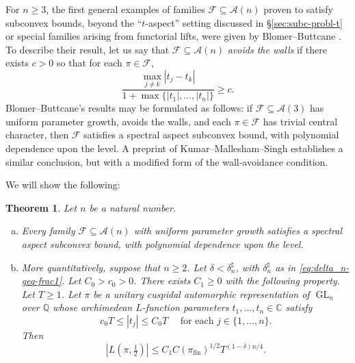 \documentclass[reqno]{amsart}
\DeclareMathOperator{\GL}{GL}
\DeclareMathOperator{\fin}{fin}
\theoremstyle{plain} \newtheorem{theorem} {Theorem}
\theoremstyle{definition} \newtheorem{definition} [theorem] {Definition}
\theoremstyle{itplain} %
\numberwithin{equation}{section}
\numberwithin{theorem}{section}
\renewcommand{\geq}{\geqslant}
\renewcommand{\leq}{\leqslant}
\begin{document}
For $n \geq 3$, the first general examples of families $\mathcal{F} \subseteq \mathcal{A}(n)$ proven to satisfy subconvex bounds, beyond the ``$t$-aspect'' setting discussed in \S\ref{sec:subc-probl-t} or special families arising from functorial lifts, were given by Blomer--Buttcane \cite{MR4203038, MR4039487}.  To describe their result, let us say that $\mathcal{F} \subseteq \mathcal{A}(n)$ \emph{avoids the walls} if there exists $c > 0$ so that for each $\pi \in \mathcal{F}$, 
\begin{equation*}
  \frac{  \max_{j \neq k}|t_j - t_k|}{1 + \max \{|t_1|,\dotsc,|t_n|\}} \geq c.
\end{equation*}
Blomer--Buttcane's results may be formulated as follows: if $\mathcal{F} \subseteq \mathcal{A}(3)$ has uniform parameter growth, avoids the walls, and each $\pi \in \mathcal{F}$ has trivial central character, then $\mathcal{F}$ satisfies a spectral aspect subconvex bound, with polynomial dependence upon the level.  A preprint of Kumar--Mallesham--Singh \cite{2020arXiv200607819K} establishes a similar conclusion, but with a modified form of the wall-avoidance condition.

We will show the following:
\begin{theorem}\label{thm:main-result}
  Let $n$ be a natural number.
  \begin{enumerate}[(a)]
  \item \label{itm:standard:main-a} Every family $\mathcal{F} \subseteq \mathcal{A}(n)$ with uniform parameter growth satisfies a spectral aspect subconvex bound, with polynomial dependence upon the level.
  \item \label{itm:standard:main-b} More quantitatively, suppose that $n \geq 2$.  Let $\delta < \delta_n ^\sharp$, with $\delta_n^\sharp$ as in \eqref{eq:delta_n-geq-frac1}.  Let $C_0 > c_0 > 0$.  There exists $C_1 \geq 0$ with the following property.  Let $T \geq 1$.  Let $\pi$ be a unitary cuspidal automorphic representation of $\GL_n$ over $\mathbb{Q}$ whose archimedean $L$-function parameters $t_1,\dotsc,t_n \in \mathbb{C}$ satisfy
 \begin{equation}\label{eq:c_1-t-leq}
    c_0 T \leq |t_j| \leq C_0 T \quad \text{ for each }  j \in \{1,\dotsc,n\}.
  \end{equation}
  Then
  \begin{equation}\label{eq:lpi-tfrac12-leq}
    |L(\pi, \tfrac{1}{2})| \leq C_1 C(\pi_{\fin})^{1/2} T^{(1-\delta)n/4}.
  \end{equation}
  \end{enumerate}
\end{theorem}
\end{document}
